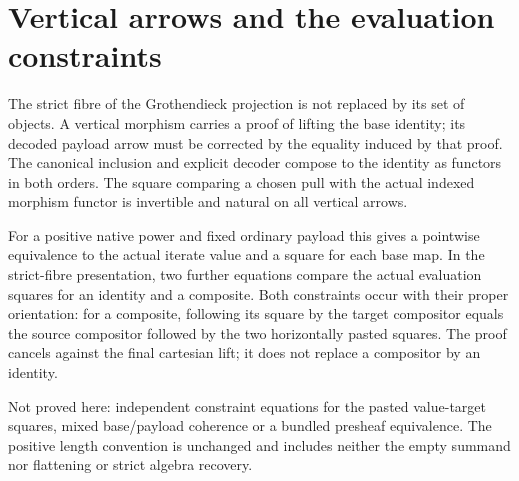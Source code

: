 \documentclass{article}
\begin{document}
\section*{Vertical arrows and the evaluation constraints}
The strict fibre of the Grothendieck projection is not replaced by its set of objects. A vertical morphism carries a proof of lifting the base identity; its decoded payload arrow must be corrected by the equality induced by that proof. The canonical inclusion and explicit decoder compose to the identity as functors in both orders. The square comparing a chosen pull with the actual indexed morphism functor is invertible and natural on all vertical arrows.
\par For a positive native power and fixed ordinary payload this gives a pointwise equivalence to the actual iterate value and a square for each base map. In the strict-fibre presentation, two further equations compare the actual evaluation squares for an identity and a composite. Both constraints occur with their proper orientation: for a composite, following its square by the target compositor equals the source compositor followed by the two horizontally pasted squares. The proof cancels against the final cartesian lift; it does not replace a compositor by an identity.
\par Not proved here: independent constraint equations for the pasted value-target squares, mixed base/payload coherence or a bundled presheaf equivalence. The positive length convention is unchanged and includes neither the empty summand nor flattening or strict algebra recovery.
\end{document}
